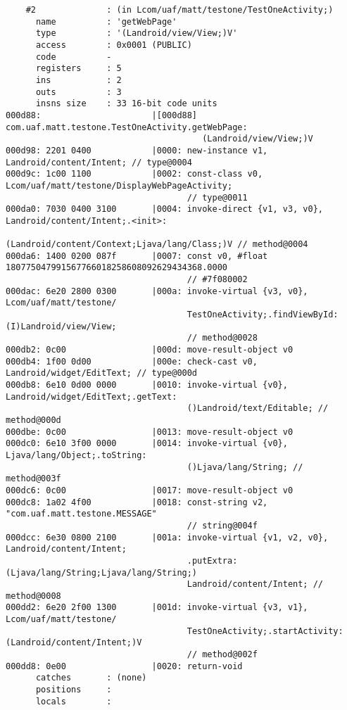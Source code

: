 \begin{lstlisting}
    #2              : (in Lcom/uaf/matt/testone/TestOneActivity;)
      name          : 'getWebPage'
      type          : '(Landroid/view/View;)V'
      access        : 0x0001 (PUBLIC)
      code          -
      registers     : 5
      ins           : 2
      outs          : 3
      insns size    : 33 16-bit code units
000d88:                      |[000d88] com.uaf.matt.testone.TestOneActivity.getWebPage:
                                       (Landroid/view/View;)V
000d98: 2201 0400            |0000: new-instance v1, Landroid/content/Intent; // type@0004
000d9c: 1c00 1100            |0002: const-class v0, Lcom/uaf/matt/testone/DisplayWebPageActivity;
                                    // type@0011
000da0: 7030 0400 3100       |0004: invoke-direct {v1, v3, v0}, Landroid/content/Intent;.<init>:
                                    (Landroid/content/Context;Ljava/lang/Class;)V // method@0004
000da6: 1400 0200 087f       |0007: const v0, #float 180775047991567766018258608092629434368.0000
                                    // #7f080002
000dac: 6e20 2800 0300       |000a: invoke-virtual {v3, v0}, Lcom/uaf/matt/testone/
                                    TestOneActivity;.findViewById:(I)Landroid/view/View;
                                    // method@0028
000db2: 0c00                 |000d: move-result-object v0
000db4: 1f00 0d00            |000e: check-cast v0, Landroid/widget/EditText; // type@000d
000db8: 6e10 0d00 0000       |0010: invoke-virtual {v0}, Landroid/widget/EditText;.getText:
                                    ()Landroid/text/Editable; // method@000d
000dbe: 0c00                 |0013: move-result-object v0
000dc0: 6e10 3f00 0000       |0014: invoke-virtual {v0}, Ljava/lang/Object;.toString:
                                    ()Ljava/lang/String; // method@003f
000dc6: 0c00                 |0017: move-result-object v0
000dc8: 1a02 4f00            |0018: const-string v2, "com.uaf.matt.testone.MESSAGE"
                                    // string@004f
000dcc: 6e30 0800 2100       |001a: invoke-virtual {v1, v2, v0}, Landroid/content/Intent;
                                    .putExtra:(Ljava/lang/String;Ljava/lang/String;)
                                    Landroid/content/Intent; // method@0008
000dd2: 6e20 2f00 1300       |001d: invoke-virtual {v3, v1}, Lcom/uaf/matt/testone/
                                    TestOneActivity;.startActivity:(Landroid/content/Intent;)V
                                    // method@002f
000dd8: 0e00                 |0020: return-void
      catches       : (none)
      positions     :
      locals        :


\end{lstlisting}
